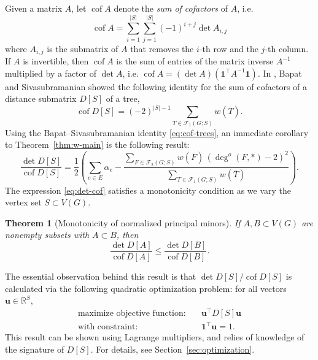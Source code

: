 \documentclass{amsart}
\newtheorem{thm}{Theorem}[section]
\newtheorem{prop}[thm]{Proposition}
\theoremstyle{definition}
\newcommand{\RR}{\mathbb{R}}
\newcommand{\bone}{\mathbf{1}}
\newcommand{\boldu}{\mathbf{u}}
\newcommand{\Da}{{D^{(\alpha)}}}
\newcommand{\tr}{\intercal}
\DeclareMathOperator{\cof}{cof}
\newcommand{\trees}{\mathcal{F}_1}
\newcommand{\forests}{\mathcal{F}}
\newcommand{\degout}{\deg^o}
\begin{document}
Given a matrix $A$, let $\cof A$ denote the {\em sum of cofactors} of $A$, i.e. 
\[
	\cof A = \sum_{i = 1}^{|S|} \sum_{j = 1}^{|S|} (-1)^{i + j} \det A_{i,j} 
\]
where $A_{i,j}$ is the submatrix of $A$ that removes the $i$-th row and the $j$-th column.
If $A$ is invertible, then $\cof A$ is 
the sum of entries of the matrix inverse $A^{-1}$ multiplied by a factor of $\det A$, i.e. $\cof A = (\det A) (\bone^\tr A^{-1} \bone)$.
In \cite{bapat-sivasubramanian}, Bapat and Sivasubramanian showed the following identity for 
the sum of cofactors of a distance submatrix $D[S]$ of a tree,
\begin{equation}\label{eq:cof-trees}
	\cof D[S] = (-2)^{|S| - 1} \sum_{T \in \trees(G;S)} w(\overline{T}) .
\end{equation}
Using the Bapat--Sivasubramanian identity \eqref{eq:cof-trees}, an immediate corollary to Theorem~\ref{thm:w-main} is the following result:
\begin{equation}
\label{eq:det-cof}
	\frac{\det D[S]}{\cof D[S]} = \frac12 \left( \sum_{e \in E} \alpha_e - \frac{\sum_{F \in \forests_2(G; S)} w(\overline{F}) \,(\degout(F,*) - 2)^2}{\sum_{T \in \trees(G; S)} w(\overline{T})} \right).
\end{equation}
The expression \eqref{eq:det-cof} satisfies a monotonicity condition as we vary the vertex set $S \subset V(G)$.

\begin{thm}[Monotonicity of normalized principal minors]
\label{thm:monotonic}
If $A,B \subset V(G)$
are nonempty subsets with
$A \subset B$,
then
\begin{equation*}
	\frac{\det D[A]}{\cof D[A]}  \leq \frac{\det D[B]}{\cof D[B]}.
\end{equation*}
\end{thm}
The essential observation behind this result is that $\det D[S] / \cof D[S]$ is calculated via the following quadratic optimization problem: for all vectors $ \boldu \in \RR^S$,
\begin{align}
	\text{maximize objective function:} &\quad \boldu^\tr D[S] \boldu \\
	\text{with constraint:} &\quad \bone^\tr \boldu = 1.
\end{align}
This result can be shown using Lagrange multipliers,
and relies of knowledge of the signature of $D[S]$.
For details, see Section~\ref{sec:optimization}.
\end{document}

